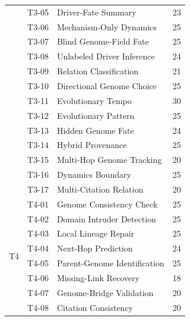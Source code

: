 \begin{table}[h]
\begin{tabular}{@{}p{1.15cm}p{1.2cm}p{5.35cm}r@{}}
& T3-05 & Driver-Fate Summary & 23 \\
& T3-06 & Mechanism-Only Dynamics & 25 \\
& T3-07 & Blind Genome-Field Fate & 25 \\
& T3-08 & Unlabeled Driver Inference & 24 \\
& T3-09 & Relation Classification & 21 \\
& T3-10 & Directional Genome Choice & 25 \\
& T3-11 & Evolutionary Tempo & 30 \\
& T3-12 & Evolutionary Pattern & 25 \\
& T3-13 & Hidden Genome Fate & 24 \\
& T3-14 & Hybrid Provenance & 25 \\
& T3-15 & Multi-Hop Genome Tracking & 20 \\
& T3-16 & Dynamics Boundary & 25 \\
& T3-17 & Multi-Citation Relation & 20 \\
\midrule
\multirow{8}{*}{T4} & T4-01 & Genome Consistency Check & 25 \\
& T4-02 & Domain Intruder Detection & 25 \\
& T4-03 & Local Lineage Repair & 25 \\
& T4-04 & Next-Hop Prediction & 24 \\
& T4-05 & Parent-Genome Identification & 25 \\
& T4-06 & Missing-Link Recovery & 18 \\
& T4-07 & Genome-Bridge Validation & 20 \\
& T4-08 & Citation Consistency & 20 \\
\bottomrule
\end{tabular}
\end{table}


